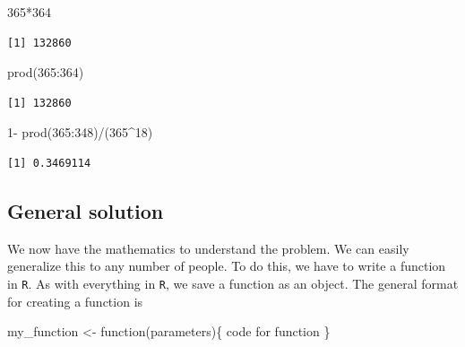 \documentclass[
  letterpaper,
  DIV=11,
  numbers=noendperiod]{scrreprt}
\newenvironment{Shaded}{\begin{snugshade}}{\end{snugshade}}
\newcommand{\ControlFlowTok}[1]{\textcolor[rgb]{0.00,0.23,0.31}{#1}}
\newcommand{\DecValTok}[1]{\textcolor[rgb]{0.68,0.00,0.00}{#1}}
\newcommand{\FunctionTok}[1]{\textcolor[rgb]{0.28,0.35,0.67}{#1}}
\newcommand{\NormalTok}[1]{\textcolor[rgb]{0.00,0.23,0.31}{#1}}
\newcommand{\OtherTok}[1]{\textcolor[rgb]{0.00,0.23,0.31}{#1}}
\newcommand{\SpecialCharTok}[1]{\textcolor[rgb]{0.37,0.37,0.37}{#1}}
\begin{document}
\begin{Shaded}
\begin{Highlighting}[]
\DecValTok{365}\SpecialCharTok{*}\DecValTok{364}
\end{Highlighting}
\end{Shaded}

\begin{verbatim}
[1] 132860
\end{verbatim}

\begin{Shaded}
\begin{Highlighting}[]
\FunctionTok{prod}\NormalTok{(}\DecValTok{365}\SpecialCharTok{:}\DecValTok{364}\NormalTok{)}
\end{Highlighting}
\end{Shaded}

\begin{verbatim}
[1] 132860
\end{verbatim}

\begin{Shaded}
\begin{Highlighting}[]
\DecValTok{1}\SpecialCharTok{{-}} \FunctionTok{prod}\NormalTok{(}\DecValTok{365}\SpecialCharTok{:}\DecValTok{348}\NormalTok{)}\SpecialCharTok{/}\NormalTok{(}\DecValTok{365}\SpecialCharTok{\^{}}\DecValTok{18}\NormalTok{)}
\end{Highlighting}
\end{Shaded}

\begin{verbatim}
[1] 0.3469114
\end{verbatim}

\subsection{General solution}\label{general-solution}

We now have the mathematics to understand the problem. We can easily
generalize this to any number of people. To do this, we have to write a
function in \texttt{R}. As with everything in \texttt{R}, we save a
function as an object. The general format for creating a function is

\begin{Shaded}
\begin{Highlighting}[]
\NormalTok{my\_function }\OtherTok{\textless{}{-}} \ControlFlowTok{function}\NormalTok{(parameters)\{}
\NormalTok{  code }\ControlFlowTok{for} \ControlFlowTok{function}
\NormalTok{\}}
\end{Highlighting}
\end{Shaded}
\end{document}
